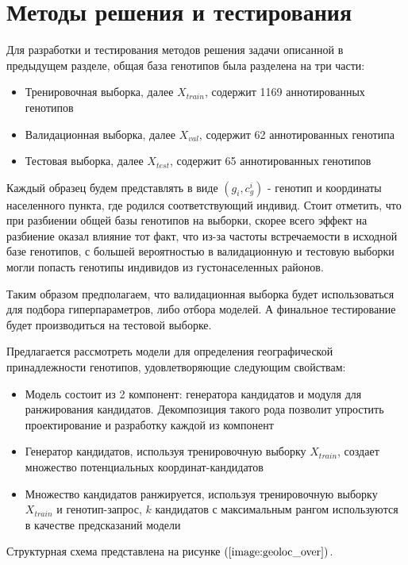 \section{Методы решения и тестирования}

Для разработки и тестирования методов решения задачи описанной в предыдущем разделе,
общая база генотипов была разделена на три части:

\begin{itemize}
\item Тренировочная выборка, далее $X_{train}$, содержит 1169 аннотированных генотипов
\item Валидационная выборка, далее $X_{val}$, содержит 62 аннотированных генотипа
\item Тестовая выборка, далее $X_{test}$, содержит 65 аннотированных генотипов
\end{itemize}

Каждый образец будем представлять в виде $(g_i, c^i_{g})$ - генотип и координаты населенного пункта,
где родился соответствующий индивид. Стоит отметить, что при разбиении общей базы генотипов
на выборки, скорее всего эффект на разбиение оказал влияние тот факт,
что из-за частоты встречаемости в исходной базе генотипов, с большей вероятностью
в валидационную и тестовую выборки могли попасть генотипы индивидов из густонаселенных районов.

Таким образом предполагаем, что валидационная выборка будет использоваться для подбора гиперпараметров,
либо отбора моделей. А финальное тестирование будет производиться на тестовой выборке.

Предлагается рассмотреть модели для определения географической принадлежности генотипов, удовлетворяющие следующим свойствам:
\begin{itemize}
\item Модель состоит из 2 компонент: генератора кандидатов и модуля для ранжирования кандидатов.
Декомпозиция такого рода позволит упростить проектирование и разработку каждой из компонент
\item Генератор кандидатов, используя тренировочную выборку $X_{train}$, создает множество потенциальных
координат-кандидатов
\item Множество кандидатов ранжируется, используя тренировочную выборку $X_{train}$ и генотип-запрос,
$k$ кандидатов с максимальным рангом используются в качестве предсказаний модели
\end{itemize}

Структурная схема представлена на рисунке $\left(\ref{image:geoloc_over}\right)$.

